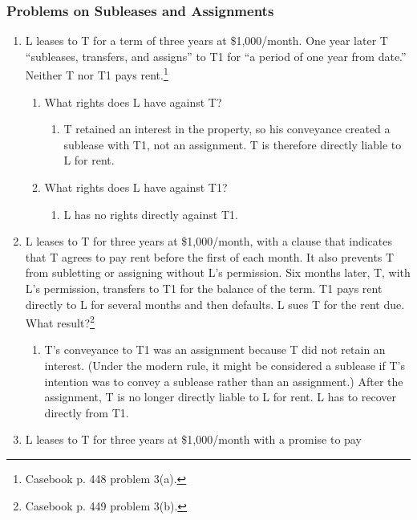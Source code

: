 \subsubsection{Problems on Subleases and Assignments}

\begin{enumerate}
    \item L leases to T for a term of three years at \$1,000/month. One year 
    later T ``subleases, transfers, and assigns'' to T1 for ``a period of one 
    year from date.'' Neither T nor T1 pays rent.\footnote{Casebook p. 448 
    problem 3(a).}
    \begin{enumerate}
        \item What rights does L have against T?
        \begin{enumerate}
            \item T retained an interest in the property, so his conveyance 
            created a sublease with T1, not an assignment. T is therefore 
            directly liable to L for rent.
        \end{enumerate}
        \item What rights does L have against T1?
        \begin{enumerate}
            \item L has no rights directly against T1.
        \end{enumerate}
    \end{enumerate}
    \item L leases to T for three years at \$1,000/month, with a clause that 
    indicates that T agrees to pay rent before the first of each month. It 
    also prevents T from subletting or assigning without L's permission. Six 
    months later, T, with L's permission, transfers to T1 for the balance of 
    the term. T1 pays rent directly to L for several months and then defaults. 
    L sues T for the rent due. What result?\footnote{Casebook p. 449 problem 
    3(b).} 
    \begin{enumerate}
        \item T's conveyance to T1 was an assignment because T did not retain 
        an interest. (Under the modern rule, it might be considered a sublease 
        if T's intention was to convey a sublease rather than an assignment.) 
        After the assignment, T is no longer directly liable to L for rent. L 
        has to recover directly from T1.
    \end{enumerate}
    \item L leases to T for three years at \$1,000/month with a promise to pay 

\end{enumerate}
